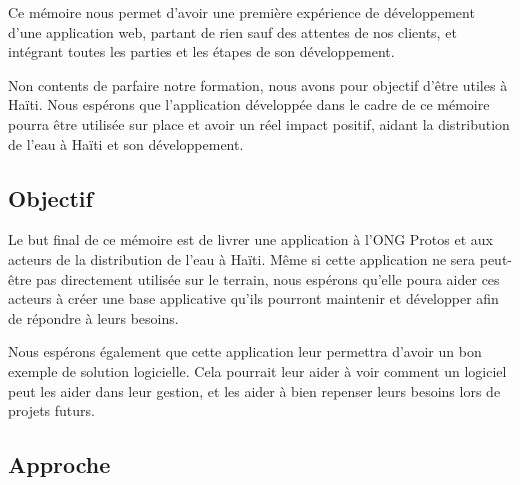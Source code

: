 \documentclass{eplmastersthesis_FR}
\begin{document}
			Ce mémoire nous permet d'avoir une première expérience de développement d'une application web, partant de rien sauf des attentes de nos clients, et intégrant toutes les parties et les étapes de son développement.

			Non contents de parfaire notre formation, nous avons pour objectif d'être utiles à Haïti. Nous espérons que l'application développée dans le cadre de ce mémoire pourra être utilisée sur place et avoir un réel impact positif, aidant la distribution de l'eau à Haïti et son développement.


		\subsection*{Objectif}

			Le but final de ce mémoire est de livrer une application à l'ONG Protos et aux acteurs de la distribution de l'eau à Haïti. Même si cette application ne sera peut-être pas directement utilisée sur le terrain, nous espérons qu'elle poura aider ces acteurs à créer une base applicative qu'ils pourront maintenir et développer afin de répondre à leurs besoins.

			Nous espérons également que cette application leur permettra d'avoir un bon exemple de solution logicielle. Cela pourrait leur aider à voir comment un logiciel peut les aider dans leur gestion, et les aider à bien repenser leurs besoins lors de projets futurs.


		\subsection*{Approche}
\end{document}
